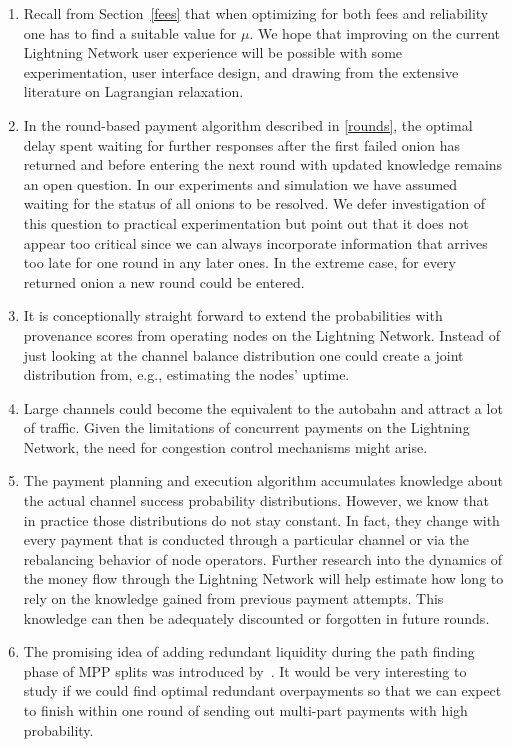 \documentclass[10pt,twocolumn]{article}
\begin{document}
\begin{enumerate}
\item Recall from Section~\ref{fees} that when optimizing for both fees and reliability one has to find a suitable value for $\mu$. We hope that improving on the current Lightning Network user experience will be possible with some experimentation, user interface design, and drawing from the extensive literature on Lagrangian relaxation.

\item In the round-based payment algorithm described in \ref{rounds}, the optimal delay spent waiting for further responses after the first failed onion has returned and before entering the next round with updated knowledge remains an open question. In our experiments and simulation we have assumed waiting for the status of all onions to be resolved. We defer investigation of this question to practical experimentation but point out that it does not appear too critical since we can always incorporate information that arrives too late for one round in any later ones. In the extreme case, for every returned onion a new round could be entered.

\item It is conceptionally straight forward to extend the probabilities with provenance scores from operating nodes on the Lightning Network.
Instead of just looking at the channel balance distribution one could create a joint distribution from, e.g., estimating the nodes' uptime.

\item Large channels could become the equivalent to the autobahn and attract a lot of traffic. Given the limitations of concurrent payments on the Lightning Network, the need for congestion control mechanisms might arise.

\item The payment planning and execution algorithm accumulates knowledge about the actual channel success probability distributions. However, we know that in practice those distributions do not stay constant. In fact, they change with every payment that is conducted through a particular channel or via the rebalancing behavior of node operators.
Further research into the dynamics of the money flow through the Lightning Network will help estimate how long to rely on the knowledge gained from previous payment attempts. This knowledge can then be adequately discounted or forgotten in future rounds.

\item The promising idea of adding redundant liquidity during the path finding phase of MPP splits was introduced by~\cite{DBLP:journals/corr/abs-1910-01834}. It would be very interesting to study if we could find optimal redundant overpayments so that we can expect to finish within one round of sending out multi-part payments with high probability.


\end{enumerate}
\end{document}
